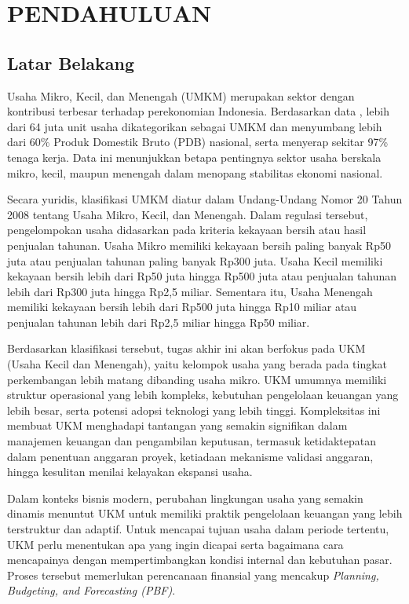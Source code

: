 \chapter{PENDAHULUAN}
\label{chap:pendahuluan}
\section{Latar Belakang}
Usaha Mikro, Kecil, dan Menengah (UMKM) merupakan sektor dengan kontribusi terbesar terhadap perekonomian Indonesia. Berdasarkan data \textcite{kemenko2024}, lebih dari 64 juta unit usaha dikategorikan sebagai UMKM dan menyumbang lebih dari 60\% Produk Domestik Bruto (PDB) nasional, serta menyerap sekitar 97\% tenaga kerja. Data ini menunjukkan betapa pentingnya sektor usaha berskala mikro, kecil, maupun menengah dalam menopang stabilitas ekonomi nasional.

Secara yuridis, klasifikasi UMKM diatur dalam Undang-Undang Nomor 20 Tahun 2008 tentang Usaha Mikro, Kecil, dan Menengah. Dalam regulasi tersebut, pengelompokan usaha didasarkan pada kriteria kekayaan bersih atau hasil penjualan tahunan. Usaha Mikro memiliki kekayaan bersih paling banyak Rp50 juta atau penjualan tahunan paling banyak Rp300 juta. Usaha Kecil memiliki kekayaan bersih lebih dari Rp50 juta hingga Rp500 juta atau penjualan tahunan lebih dari Rp300 juta hingga Rp2,5 miliar. Sementara itu, Usaha Menengah memiliki kekayaan bersih lebih dari Rp500 juta hingga Rp10 miliar atau penjualan tahunan lebih dari Rp2,5 miliar hingga Rp50 miliar.

Berdasarkan klasifikasi tersebut, tugas akhir ini akan berfokus pada UKM (Usaha Kecil dan Menengah), yaitu kelompok usaha yang berada pada tingkat perkembangan lebih matang dibanding usaha mikro. UKM umumnya memiliki struktur operasional yang lebih kompleks, kebutuhan pengelolaan keuangan yang lebih besar, serta potensi adopsi teknologi yang lebih tinggi. Kompleksitas ini membuat UKM menghadapi tantangan yang semakin signifikan dalam manajemen keuangan dan pengambilan keputusan, termasuk ketidaktepatan dalam penentuan anggaran proyek, ketiadaan mekanisme validasi anggaran, hingga kesulitan menilai kelayakan ekspansi usaha.

Dalam konteks bisnis modern, perubahan lingkungan usaha yang semakin dinamis menuntut UKM untuk memiliki praktik pengelolaan keuangan yang lebih terstruktur dan adaptif. Untuk mencapai tujuan usaha dalam periode tertentu, UKM perlu menentukan apa yang ingin dicapai serta bagaimana cara mencapainya dengan mempertimbangkan kondisi internal dan kebutuhan pasar. Proses tersebut memerlukan perencanaan finansial yang mencakup \textit{Planning, Budgeting, and Forecasting (PBF)}.

